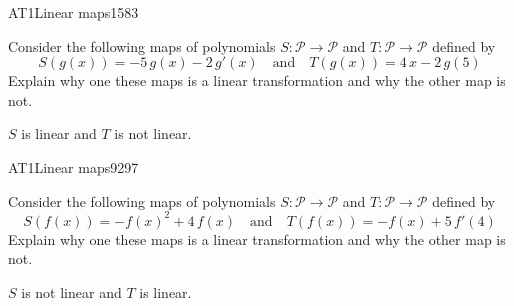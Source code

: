 \begin{exercise}{AT1}{Linear maps}{1583} 
\begin{exerciseStatement} 

 Consider the following maps of polynomials \(S:\mathcal{P}\rightarrow\mathcal{P}\) and \(T:\mathcal{P}\rightarrow\mathcal{P}\) defined by \[
            S(g(x))=
                    -5 \, g\left(x\right) - 2 \, g'\left(x\right)
                \hspace{1em} \text{and} \hspace{1em}
            T(g(x))=
                    4 \, x - 2 \, g\left(5\right)
        \] Explain why one these maps is a linear transformation and why the other map is not. 

 \end{exerciseStatement}
 \begin{exerciseAnswer} 

\(S\) is linear and \(T\) is not linear.

 \end{exerciseAnswer}
 \end{exercise}


\begin{exercise}{AT1}{Linear maps}{9297} 
\begin{exerciseStatement} 

 Consider the following maps of polynomials \(S:\mathcal{P}\rightarrow\mathcal{P}\) and \(T:\mathcal{P}\rightarrow\mathcal{P}\) defined by \[
            S(f(x))=
                    -f\left(x\right)^{2} + 4 \, f\left(x\right)
                \hspace{1em} \text{and} \hspace{1em}
            T(f(x))=
                    -f\left(x\right) + 5 \, f'\left(4\right)
        \] Explain why one these maps is a linear transformation and why the other map is not. 

 \end{exerciseStatement}
 \begin{exerciseAnswer} 

\(S\) is not linear and \(T\) is linear.

 \end{exerciseAnswer}
 \end{exercise}


